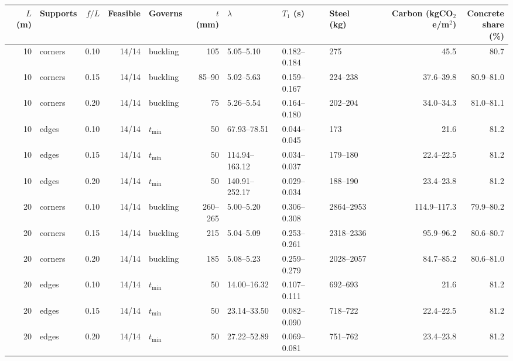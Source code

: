 \scriptsize
\begin{tabular}{rlrrlrlllrr}
\toprule
$L$ (m) & Supports & $f/L$ & Feasible & Governs & $t$ (mm) & $\lambda$ & $T_1$ (s) & Steel (kg) & \shortstack{Carbon\\(kgCO$_2$e/m$^2$)} & \shortstack{Concrete\\share (\%)} \\
\midrule
10 & corners & 0.10 & 14/14 & buckling & 105 & 5.05--5.10 & 0.182--0.184 & 275 & 45.5 & 80.7 \\
10 & corners & 0.15 & 14/14 & buckling & 85--90 & 5.02--5.63 & 0.159--0.167 & 224--238 & 37.6--39.8 & 80.9--81.0 \\
10 & corners & 0.20 & 14/14 & buckling & 75 & 5.26--5.54 & 0.164--0.180 & 202--204 & 34.0--34.3 & 81.0--81.1 \\
10 & edges & 0.10 & 14/14 & $t_{\mathrm{min}}$ & 50 & 67.93--78.51 & 0.044--0.045 & 173 & 21.6 & 81.2 \\
10 & edges & 0.15 & 14/14 & $t_{\mathrm{min}}$ & 50 & 114.94--163.12 & 0.034--0.037 & 179--180 & 22.4--22.5 & 81.2 \\
10 & edges & 0.20 & 14/14 & $t_{\mathrm{min}}$ & 50 & 140.91--252.17 & 0.029--0.034 & 188--190 & 23.4--23.8 & 81.2 \\
20 & corners & 0.10 & 14/14 & buckling & 260--265 & 5.00--5.20 & 0.306--0.308 & 2864--2953 & 114.9--117.3 & 79.9--80.2 \\
20 & corners & 0.15 & 14/14 & buckling & 215 & 5.04--5.09 & 0.253--0.261 & 2318--2336 & 95.9--96.2 & 80.6--80.7 \\
20 & corners & 0.20 & 14/14 & buckling & 185 & 5.08--5.23 & 0.259--0.279 & 2028--2057 & 84.7--85.2 & 80.6--81.0 \\
20 & edges & 0.10 & 14/14 & $t_{\mathrm{min}}$ & 50 & 14.00--16.32 & 0.107--0.111 & 692--693 & 21.6 & 81.2 \\
20 & edges & 0.15 & 14/14 & $t_{\mathrm{min}}$ & 50 & 23.14--33.50 & 0.082--0.090 & 718--722 & 22.4--22.5 & 81.2 \\
20 & edges & 0.20 & 14/14 & $t_{\mathrm{min}}$ & 50 & 27.22--52.89 & 0.069--0.081 & 751--762 & 23.4--23.8 & 81.2 \\
\bottomrule
\end{tabular}
